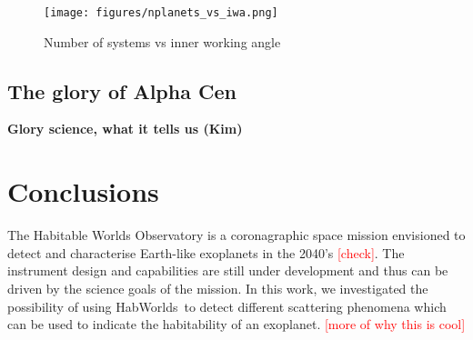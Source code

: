 \documentclass[
    usenatbib,
]{mnras}
\newcommand{\todo}[1]{\textcolor{red}{[#1]}}
\newcommand{\hwo}{HabWorlds}
\begin{document}
\begin{figure*}
    \centering
    \texttt{[image: figures/nplanets\_vs\_iwa.png]}  
    \caption{
        Number of systems vs inner working angle
    }
    \label{fig:accessible_phase_angles}
\end{figure*}





\subsection{The glory of Alpha Cen}%
\label{sec:ealpha-cen}
\textbf{Glory science, what it tells us (Kim)}




\section{Conclusions}

The Habitable Worlds Observatory is a coronagraphic space mission envisioned to detect and characterise Earth-like exoplanets in the 2040's \todo{check}. 
%
The instrument design and capabilities are still under development and thus can be driven by the science goals of the mission.
%
In this work, we investigated the possibility of using \hwo\ to detect different scattering phenomena which can be used to indicate the habitability of an exoplanet. \todo{more of why this is cool}
\end{document}
